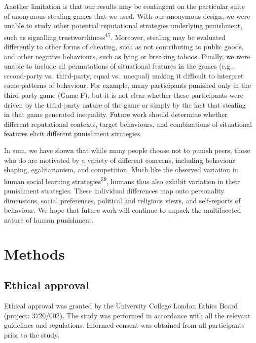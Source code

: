 \documentclass[
  man,floatsintext]{apa6}
\begin{document}
Another limitation is that our results may be contingent on the particular suite
of anonymous stealing games that we used. With our anonymous design, we were
unable to study other potential reputational strategies underlying punishment,
such as signalling trustworthiness\textsuperscript{47}. Moreover, stealing may be
evaluated differently to other forms of cheating, such as not contributing to
public goods, and other negative behaviours, such as lying or breaking taboos.
Finally, we were unable to include all permutations of situational features in
the games (e.g., second-party vs.~third-party, equal vs.~unequal) making it
difficult to interpret some patterns of behaviour. For example, many
participants punished only in the third-party game (Game F), but it is not clear
whether these participants were driven by the third-party nature of the game or
simply by the fact that stealing in that game generated inequality. Future work
should determine whether different reputational contexts, target behaviours, and
combinations of situational features elicit different punishment strategies.

In sum, we have shown that while many people choose not to punish peers, those
who do are motivated by a variety of different concerns, including behaviour
shaping, egalitarianism, and competition. Much like the observed variation in
human social learning strategies\textsuperscript{39}, humans thus also exhibit
variation in their punishment strategies. These individual differences map onto
personality dimensions, social preferences, political and religious views, and
self-reports of behaviour. We hope that future work will continue to unpack the
multifaceted nature of human punishment.

\hypertarget{methods}{%
\section{Methods}\label{methods}}

\hypertarget{ethical-approval}{%
\subsection{Ethical approval}\label{ethical-approval}}

Ethical approval was granted by the University College London Ethics Board
(project: 3720/002). The study was performed in accordance with all the relevant
guidelines and regulations. Informed consent was obtained from all participants
prior to the study.
\end{document}
